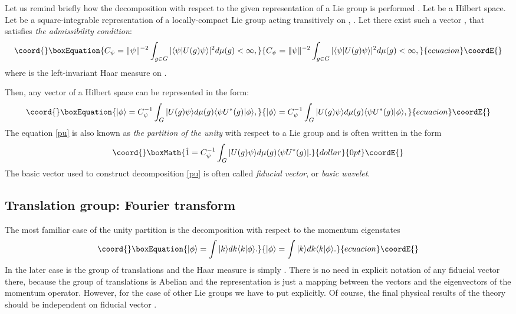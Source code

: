 \documentclass[a4paper,a4paper]{article}
\def\bra{\langle}
\def\ket{\rangle}
\providecommand{\R}{\mathbb{R}}
\def\cH{{\mathcal H}}             %
\def\bra{\langle}
\def\ket{\rangle}
\begin{document}
Let us remind briefly how the decomposition with respect to the given  
representation of a Lie group is performed \cite{Carey76,DM1976}. 
Let \myHighlight{$\cH$}\coordHE{} be a Hilbert space. Let \coordHE{} be a square-integrable 
representation of a locally-compact Lie group \coordHE{} acting transitively 
on \myHighlight{$\cH$}\coordHE{}, \myHighlight{$\forall \phi\in\cH,g\in G : U(g)\phi \in \cH$}\coordHE{}. Let there 
exist such a vector  \myHighlight{$|\psi\ket \in \cH$}\coordHE{}, that satisfies  
{\em the admissibility condition}: 
\begin{equation}\coord{}\boxEquation{
C_\psi = \|\psi \|^{-2} \int_{g\in G} |\bra\psi|U(g)\psi \ket|^2 d\mu(g) < \infty
,
\label{adc}
}{
C_\psi = \|\psi \|^{-2} \int_{g\in G} |\bra\psi|U(g)\psi \ket|^2 d\mu(g) < \infty
,
}{ecuacion}\coordE{}\end{equation}
where \coordHE{} is the left-invariant Haar measure on \coordHE{}.

Then, any vector \myHighlight{$|\phi\ket$}\coordHE{} of a Hilbert space \myHighlight{$\cH$}\coordHE{} can be 
represented in the form:
\begin{equation}\coord{}\boxEquation{
|\phi\ket = C_\psi^{-1} \int_G |U(g)\psi\ket d\mu(g)\bra\psi U^*(g)|\phi\ket,
\label{pu}
}{
|\phi\ket = C_\psi^{-1} \int_G |U(g)\psi\ket d\mu(g)\bra\psi U^*(g)|\phi\ket,
}{ecuacion}\coordE{}\end{equation}
The equation \eqref{pu} is also known as {\em the partition of the unity} 
with respect to a Lie group \coordHE{} and is often written in the form 
$$\coord{}\boxMath{ \hat 1 = C_\psi^{-1} \int_G |U(g)\psi\ket d\mu(g)\bra\psi U^*(g)|.}{dollar}{0pt}\coordE{}$$
The basic vector \myHighlight{$\psi$}\coordHE{} used to construct decomposition \eqref{pu} is 
often called {\em fiducial vector}, or {\em basic wavelet}. 

\subsection{Translation group: Fourier transform}
The most familiar case of the unity partition is the decomposition with 
respect to the momentum eigenstates 
\begin{equation}\coord{}\boxEquation{
|\phi\ket = \int |k\ket dk \bra k |\phi\ket.
\label{puk}
}{
|\phi\ket = \int |k\ket dk \bra k |\phi\ket.
}{ecuacion}\coordE{}\end{equation} 
In the later case \coordHE{} is the group of translations and 
the Haar measure is simply \coordHE{}. There is no need in explicit notation 
of any fiducial vector \myHighlight{$\psi$}\coordHE{} there, because the group of translations 
is Abelian and the representation \coordHE{} is just a mapping between the 
vectors \myHighlight{$k\in\R^n$}\coordHE{} and the eigenvectors of the momentum operator. However, 
for the case of other Lie groups we have to put \myHighlight{$\psi$}\coordHE{} explicitly. 
Of course, the final physical results of the theory should be independent 
on fiducial vector \myHighlight{$\psi$}\coordHE{}.
\end{document}
